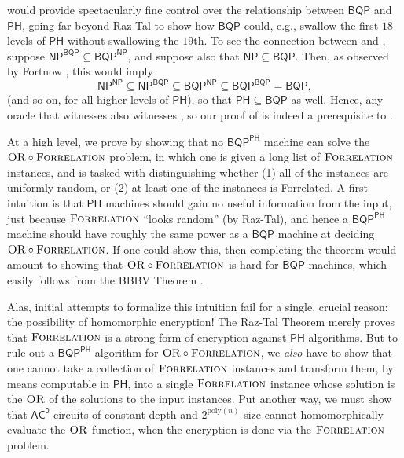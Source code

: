 \documentclass[10pt,a4paper]{article}
\newcommand{\poly}{\mathrm{poly}}
\newcommand{\OR}{\normalfont\textsc{OR}}
\newcommand{\Forrelation}{\normalfont\textsc{Forrelation}}
\begin{document}
 would provide spectacularly fine control over the relationship between $\mathsf{BQP}$ and $\mathsf{PH}$, going far beyond Raz-Tal to show how $\mathsf{BQP}$ could, e.g., swallow the first $18$ levels of $\mathsf{PH}$ without swallowing the $19$th.  To see the connection between  and , suppose $\mathsf{NP}^\mathsf{BQP} \subseteq \mathsf{BQP}^\mathsf{NP}$, and suppose also that $\mathsf{NP} \subseteq \mathsf{BQP}$.  Then, as observed by Fortnow \cite{For05}, this would imply
\[
\mathsf{NP}^\mathsf{NP} \subseteq \mathsf{NP}^\mathsf{BQP} \subseteq \mathsf{BQP}^\mathsf{NP} \subseteq \mathsf{BQP}^\mathsf{BQP} = \mathsf{BQP},
\]
(and so on, for all higher levels of $\mathsf{PH}$), so that $\mathsf{PH} \subseteq \mathsf{BQP}$ as well. Hence, any oracle that witnesses  also witnesses , so our proof of  is indeed a prerequisite to .

At a high level, we prove  by showing that no $\mathsf{BQP}^\mathsf{PH}$ machine can solve the $\OR \circ \Forrelation$ problem, in which one is given a long list of $\Forrelation$ instances, and is tasked with distinguishing whether (1) all of the instances are uniformly random, or (2) at least one of the instances is Forrelated. A first intuition is that $\mathsf{PH}$ machines should gain no useful information from the input, just because $\Forrelation$ ``looks random'' (by Raz-Tal), and hence a $\mathsf{BQP}^\mathsf{PH}$ machine should have roughly the same power as a $\mathsf{BQP}$ machine at deciding $\OR \circ \Forrelation$. If one could show this, then completing the theorem would amount to showing that $\OR \circ \Forrelation$ is hard for $\mathsf{BQP}$ machines, which easily follows from the BBBV Theorem \cite{BBBV97}.

Alas, initial attempts to formalize this intuition fail for a single, crucial reason: the possibility of homomorphic encryption! The Raz-Tal Theorem merely proves that $\Forrelation$ is a strong form of encryption against $\mathsf{PH}$ algorithms. But to rule out a $\mathsf{BQP}^\mathsf{PH}$ algorithm for $\OR \circ \Forrelation$, we \textit{also} have to show that one cannot take a collection of $\Forrelation$ instances and transform them, by means computable in $\mathsf{PH}$, into a single $\Forrelation$ instance whose solution is the $\OR$ of the solutions to the input instances. Put another way, we must show that $\mathsf{AC^0}$ circuits of constant depth and $2^{\poly(n)}$ size cannot homomorphically evaluate the $\OR$ function, when the encryption is done via the $\Forrelation$ problem.
\end{document}
